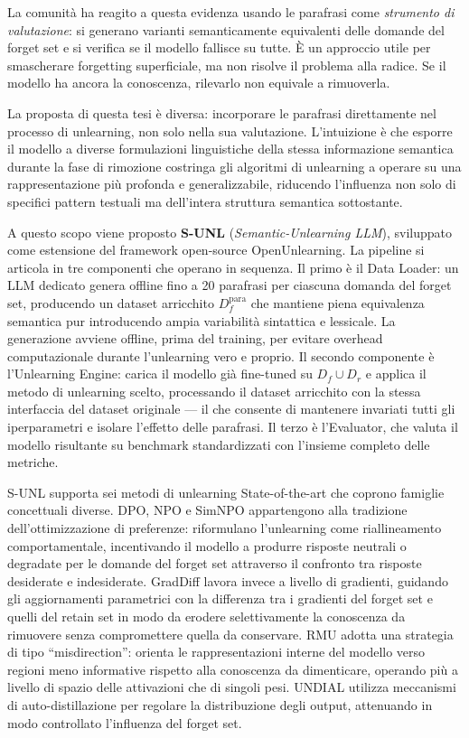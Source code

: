 \documentclass[12pt,a4paper]{article}
\begin{document}
La comunità ha reagito a questa evidenza usando le parafrasi come \emph{strumento di valutazione}: si generano varianti semanticamente equivalenti delle domande del forget set e si verifica se il modello fallisce su tutte. È un approccio utile per smascherare forgetting superficiale, ma non risolve il problema alla radice. Se il modello ha ancora la conoscenza, rilevarlo non equivale a rimuoverla.

La proposta di questa tesi è diversa: incorporare le parafrasi direttamente nel processo di unlearning, non solo nella sua valutazione. L'intuizione è che esporre il modello a diverse formulazioni linguistiche della stessa informazione semantica durante la fase di rimozione costringa gli algoritmi di unlearning a operare su una rappresentazione più profonda e generalizzabile, riducendo l'influenza non solo di specifici pattern testuali ma dell'intera struttura semantica sottostante.

A questo scopo viene proposto \textbf{S-UNL} (\emph{Semantic-Unlearning LLM}), sviluppato come estensione del framework open-source OpenUnlearning. La pipeline si articola in tre componenti che operano in sequenza. Il primo è il Data Loader: un LLM dedicato genera offline fino a 20 parafrasi per ciascuna domanda del forget set, producendo un dataset arricchito $D_f^{\text{para}}$ che mantiene piena equivalenza semantica pur introducendo ampia variabilità sintattica e lessicale. La generazione avviene offline, prima del training, per evitare overhead computazionale durante l'unlearning vero e proprio. Il secondo componente è l'Unlearning Engine: carica il modello già fine-tuned su $D_f \cup D_r$ e applica il metodo di unlearning scelto, processando il dataset arricchito con la stessa interfaccia del dataset originale — il che consente di mantenere invariati tutti gli iperparametri e isolare l'effetto delle parafrasi. Il terzo è l'Evaluator, che valuta il modello risultante su benchmark standardizzati con l'insieme completo delle metriche.

S-UNL supporta sei metodi di unlearning State-of-the-art che coprono famiglie concettuali diverse. DPO, NPO e SimNPO appartengono alla tradizione dell'ottimizzazione di preferenze: riformulano l'unlearning come riallineamento comportamentale, incentivando il modello a produrre risposte neutrali o degradate per le domande del forget set attraverso il confronto tra risposte desiderate e indesiderate. GradDiff lavora invece a livello di gradienti, guidando gli aggiornamenti parametrici con la differenza tra i gradienti del forget set e quelli del retain set in modo da erodere selettivamente la conoscenza da rimuovere senza compromettere quella da conservare. RMU adotta una strategia di tipo ``misdirection'': orienta le rappresentazioni interne del modello verso regioni meno informative rispetto alla conoscenza da dimenticare, operando più a livello di spazio delle attivazioni che di singoli pesi. UNDIAL utilizza meccanismi di auto-distillazione per regolare la distribuzione degli output, attenuando in modo controllato l'influenza del forget set.
\end{document}

